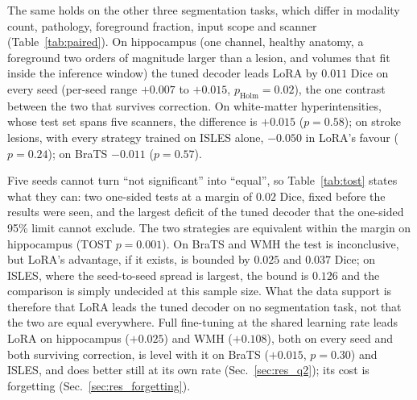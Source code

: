 \iffull\documentclass[journal]{IEEEtran}\else\documentclass[journal,twoside,web]{ieeecolor}\usepackage{generic}\fi
\begin{document}
The same holds on the other three segmentation tasks, which differ in modality count, pathology, foreground fraction, input scope and scanner (Table~\ref{tab:paired}). On hippocampus (one channel, healthy anatomy, a foreground two orders of magnitude larger than a lesion, and volumes that fit inside the inference window) the tuned decoder leads LoRA by $0.011$ Dice on every seed (per-seed range $+0.007$ to $+0.015$, $p_{\text{Holm}}=0.02$), the one contrast between the two that survives correction. On white-matter hyperintensities, whose test set spans five scanners, the difference is $+0.015$ ($p=0.58$); on stroke lesions, with every strategy trained on ISLES alone, $-0.050$ in LoRA's favour ($p=0.24$); on BraTS $-0.011$ ($p=0.57$).

Five seeds cannot turn ``not significant'' into ``equal'', so Table~\ref{tab:tost} states what they can: two one-sided tests at a margin of $0.02$ Dice, fixed before the results were seen, and the largest deficit of the tuned decoder that the one-sided 95\% limit cannot exclude. The two strategies are equivalent within the margin on hippocampus (TOST $p=0.001$). On BraTS and WMH the test is inconclusive, but LoRA's advantage, if it exists, is bounded by $0.025$ and $0.037$ Dice; on ISLES, where the seed-to-seed spread is largest, the bound is $0.126$ and the comparison is simply undecided at this sample size. What the data support is therefore that LoRA leads the tuned decoder on no segmentation task, not that the two are equal everywhere. Full fine-tuning at the shared learning rate leads LoRA on hippocampus ($+0.025$) and WMH ($+0.108$), both on every seed and both surviving correction, is level with it on BraTS ($+0.015$, $p=0.30$) and ISLES, and does better still at its own rate (Sec.~\ref{sec:res_q2}); its cost is forgetting (Sec.~\ref{sec:res_forgetting}).

\begin{table}[t]
\caption{Equivalence and non-inferiority of decoder tuning (HT) against LoRA + head ($r{=}16$) on the four segmentation tasks, seed as the unit: mean paired $\Delta$Dice (HT $-$ LoRA), its 90\% CI, the TOST $p$-value at a margin of $\pm0.02$ Dice, the verdict (equivalent if $p<0.05$, otherwise inconclusive), and the largest deficit of HT relative to LoRA that the one-sided 95\% limit cannot exclude.}
\label{tab:tost}
\centering
\scriptsize
\setlength{\tabcolsep}{2.5pt}
\end{table}
\end{document}
